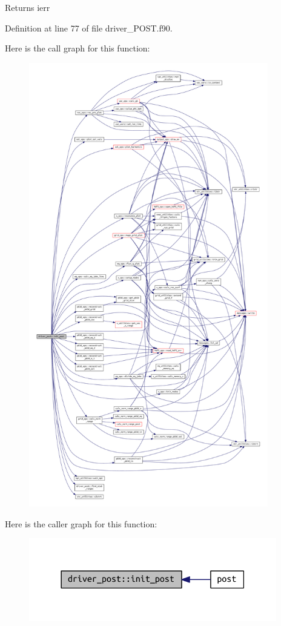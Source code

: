 \begin{DoxyReturn}{Returns}
ierr 
\end{DoxyReturn}


Definition at line 77 of file driver\+\_\+\+P\+O\+S\+T.\+f90.

Here is the call graph for this function\+:\nopagebreak
\begin{figure}[H]
\begin{center}
\leavevmode
\includegraphics[height=550pt]{namespacedriver__post_af527706d4e696d4e507443d2f74194ef_cgraph}
\end{center}
\end{figure}
Here is the caller graph for this function\+:\nopagebreak
\begin{figure}[H]
\begin{center}
\leavevmode
\includegraphics[width=306pt]{namespacedriver__post_af527706d4e696d4e507443d2f74194ef_icgraph}
\end{center}
\end{figure}
